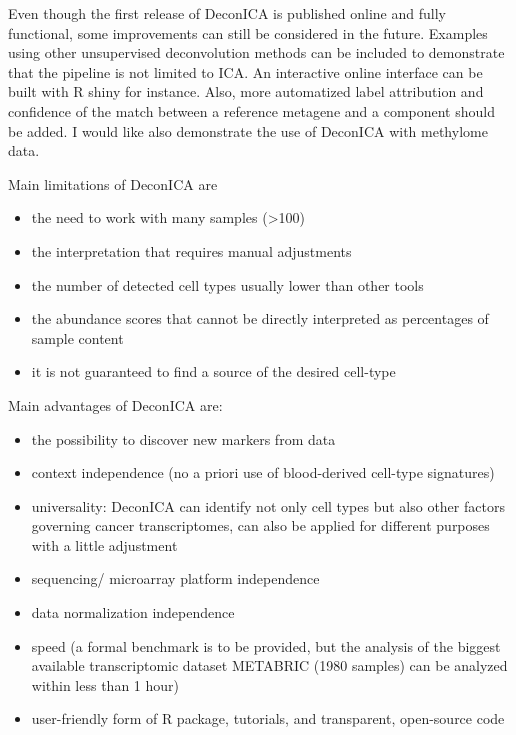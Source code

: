 \documentclass[12pt,]{book}
\providecommand{\tightlist}{%
  \setlength{\itemsep}{0pt}\setlength{\parskip}{0pt}}
\theoremstyle{definition}
\theoremstyle{definition}
\theoremstyle{definition}
\theoremstyle{remark}
\begin{document}
Even though the first release of DeconICA is published online
\citep{Czerwinska2018} and fully functional, some improvements can still
be considered in the future. Examples using other unsupervised
deconvolution methods can be included to demonstrate that the pipeline
is not limited to ICA. An interactive online interface can be built with
R shiny for instance. Also, more automatized label attribution and
confidence of the match between a reference metagene and a component
should be added. I would like also demonstrate the use of DeconICA with
methylome data.

Main limitations of DeconICA are

\begin{itemize}
\tightlist
\item
  the need to work with many samples (\textgreater{}100)
\item
  the interpretation that requires manual adjustments
\item
  the number of detected cell types usually lower than other tools
\item
  the abundance scores that cannot be directly interpreted as
  percentages of sample content
\item
  it is not guaranteed to find a source of the desired cell-type
\end{itemize}

Main advantages of DeconICA are:

\begin{itemize}
\tightlist
\item
  the possibility to discover new markers from data
\item
  context independence (no a priori use of blood-derived cell-type
  signatures)
\item
  universality: DeconICA can identify not only cell types but also other
  factors governing cancer transcriptomes, can also be applied for
  different purposes with a little adjustment
\item
  sequencing/ microarray platform independence
\item
  data normalization independence
\item
  speed (a formal benchmark is to be provided, but the analysis of the
  biggest available transcriptomic dataset METABRIC (1980 samples) can
  be analyzed within less than 1 hour)
\item
  user-friendly form of R package, tutorials, and transparent,
  open-source code
\end{itemize}
\end{document}

